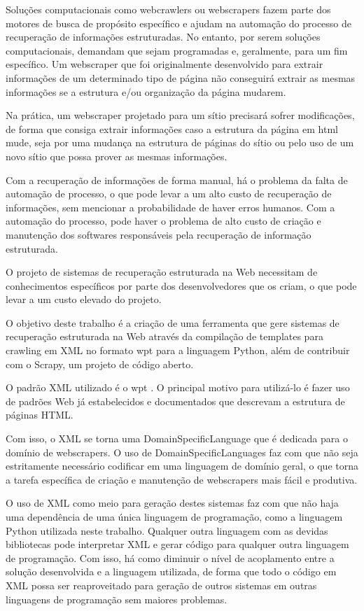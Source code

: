 Soluções computacionais como \glspl{webcrawler} ou \glspl{webscraper} fazem parte dos motores de busca de propósito específico  e ajudam na automação do processo de recuperação de informações estruturadas. No entanto, por serem soluções computacionais, demandam que sejam programadas e, geralmente, para um fim específico. Um \gls{webscraper} que foi originalmente desenvolvido para extrair informações de um determinado tipo de página não conseguirá extrair as mesmas informações se a estrutura e/ou organização da página mudarem.

Na prática, um \gls{webscraper} projetado para um sítio precisará sofrer modificações, de forma que consiga extrair informações caso a estrutura da página em \gls{html} mude, seja por uma mudança na estrutura de páginas do sítio ou pelo uso de um novo sítio que possa prover as mesmas informações.

Com a recuperação de informações de forma manual, há o problema da falta de automação de processo, o que pode levar a um alto custo  de recuperação de informações, sem mencionar a probabilidade de haver erros humanos. Com a automação do processo, pode haver o problema de alto custo de criação e manutenção dos softwares responsáveis pela recuperação de informação estruturada.

O projeto de sistemas de recuperação estruturada na Web necessitam de conhecimentos específicos por parte dos desenvolvedores que os criam, o que pode levar a um custo elevado do projeto.

O objetivo deste trabalho é a criação de uma ferramenta que gere sistemas de recuperação estruturada na Web através da compilação de templates para \gls{crawling} em XML no formato \gls{wpt} para a linguagem Python, além de contribuir com o Scrapy, um projeto de código aberto.

O padrão XML utilizado é o \gls{wpt} \cite{wpt}. O principal motivo para utilizá-lo é fazer uso de padrões Web já estabelecidos e documentados que descrevam a estrutura de páginas HTML.

Com isso, o XML se torna uma \gls{DomainSpecificLanguage} que é dedicada para o domínio de \glspl{webscraper}. O uso de \glspl{DomainSpecificLanguage} faz com que não seja estritamente necessário codificar em uma linguagem de domínio geral, o que torna a tarefa específica de criação e manutenção de \glspl{webscraper} mais fácil e produtiva.

O uso de XML como meio para geração destes sistemas faz com que não haja uma dependência de uma única linguagem de programação, como a linguagem Python utilizada neste trabalho. Qualquer outra linguagem com as devidas bibliotecas pode interpretar XML e gerar código para qualquer outra linguagem de programação. Com isso, há como diminuir o nível de acoplamento entre a solução desenvolvida e a linguagem utilizada, de forma que todo o código em XML possa ser reaproveitado para geração de outros sistemas em outras linguagens de programação sem maiores problemas.

